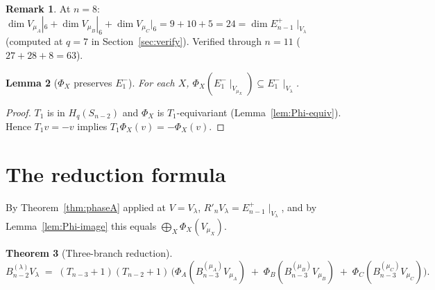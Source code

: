 \documentclass[11pt]{article}
\newtheorem{theorem}{Theorem}
\newtheorem{lemma}[theorem]{Lemma}
\theoremstyle{definition}
\newtheorem{remark}[theorem]{Remark}
\begin{document}
\begin{remark}\label{rem:dim-check}
At $n=8$: $\dim V_{\mu_A}|_6+\dim V_{\mu_B}|_6+\dim V_{\mu_C}|_6
=9+10+5=24=\dim E_{n-1}^+\!\mid_{V_\lambda}$ (computed at $q=7$
in Section~\ref{sec:verify}).  Verified through $n=11$
($27+28+8=63$).
\end{remark}

\begin{lemma}[$\Phi_X$ preserves $E_1^-$]\label{lem:Phi-E1}
For each $X$, $\Phi_X(E_1^-\!\mid_{V_{\mu_X}})\subseteq
E_1^-\!\mid_{V_\lambda}$.
\end{lemma}

\begin{proof}
$T_1$ is in $H_q(S_{n-2})$ and $\Phi_X$ is $T_1$-equivariant
(Lemma~\ref{lem:Phi-equiv}). Hence $T_1v=-v$ implies
$T_1\Phi_X(v)=-\Phi_X(v)$.
\end{proof}

\section{The reduction formula}\label{sec:reduction}

By Theorem~\ref{thm:phaseA} applied at $V=V_\lambda$,
$R'_n V_\lambda=E_{n-1}^+\!\mid_{V_\lambda}$, and by
Lemma~\ref{lem:Phi-image} this equals $\bigoplus_X\Phi_X(V_{\mu_X})$.

\begin{theorem}[Three-branch reduction]\label{thm:reduction}
\begin{equation}\label{eq:reduction}
   B_{n-2}^{(\lambda)} V_\lambda
   \;=\;
   (T_{n-3}{+}1)(T_{n-2}{+}1)\,
   \Big(\Phi_A(B_{n-3}^{(\mu_A)} V_{\mu_A})
       \;+\;\Phi_B(B_{n-3}^{(\mu_B)} V_{\mu_B})
       \;+\;\Phi_C(B_{n-3}^{(\mu_C)} V_{\mu_C})\Big).
\end{equation}
\end{theorem}
\end{document}
